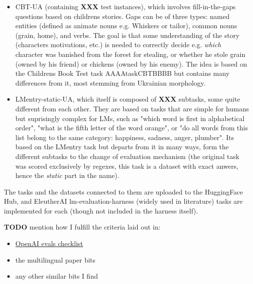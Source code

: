 \begin{itemize}
\tightlist
\item
  CBT-UA (containing \textbf{XXX} test instances), which involves
  fill-in-the-gaps questions based on children\textquotesingle s
  stories. Gaps can be of three types: named entities (defined as
  animate nouns e.g. \textquotesingle Whiskers\textquotesingle{} or
  \textquotesingle tailor\textquotesingle), common nouns (grain, home),
  and verbs. The goal is that some understanding of the story
  (characters\textquotesingle{} motivations, etc.) is needed to
  correctly decide e.g. \emph{which} character was banished from the
  forest for stealing, or whether he stole grain (owned by his friend)
  or chickens (owned by his enemy). The idea is based on the
  Children\textquotesingle s Book Test task AAAAtaskCBTBBBB but contains
  many differences from it, most stemming from Ukrainian morphology.
\item
  LMentry-static-UA, which itself is composed of \textbf{XXX} subtasks,
  some quite different from each other. They are based on tasks that are
  simple for humans but suprisingly complex for LMs, such as "which word
  is first in alphabetical order", "what is the fifth letter of the word
  \textquotesingle orange\textquotesingle", or "do all words from this
  list belong to the same category: happiness, sadness, anger, plumber".
  It\textquotesingle s based on the LMentry task \cite{bm_lmentry} but
  departs from it in many ways, form the different subtasks to the
  change of evaluation mechanism (the original task was scored
  exclusively by regexes, this task is a dataset with exact anwers,
  hence the \emph{static} part in the name).
\end{itemize}

The tasks and the datasets connected to them are uploaded to the
HuggingFace Hub, and EleutherAI lm-evaluation-harness (widely used in
literature) \textquotesingle tasks\textquotesingle{} are implemented for
each (though not included in the harness itself).

\textbf{TODO} mention how I fulfill the criteria laid out in:

\begin{itemize}
\tightlist
\item
  \href{https://github.com/openai/evals/blob/main/docs/build-eval.md\#criteria-for-contributing-an-eval}{OpenAI
  evals checklist}
\item
  the multilingual paper bits
\item
  any other similar bits I find
\end{itemize}


